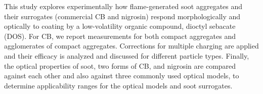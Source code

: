 This study explores experimentally how flame-generated soot aggregates and their surrogates (commercial CB and nigrosin) respond morphologically and optically to coating by a low-volatility organic compound, dioctyl sebacate (DOS). For CB, we report measurements for both compact aggregates and agglomerates of compact aggregates. Corrections for multiple charging are applied and their efficacy is analyzed and discussed for different particle types. Finally, the optical properties of soot, two forms of CB, and nigrosin are compared against each other and also against three commonly used optical models, to determine applicability ranges for the optical models and soot surrogates.